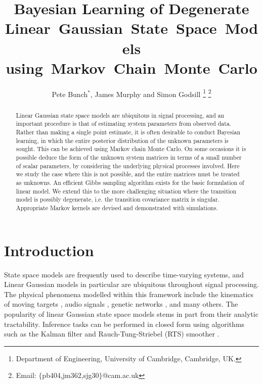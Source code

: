 \documentclass[journal,10pt]{IEEEtran}
\title{Bayesian Learning of Degenerate Linear~Gaussian~State~Space~Models using~Markov~Chain~Monte~Carlo}
\author{Pete Bunch$^*$, James Murphy and Simon Godsill
  \thanks{Department of Engineering, University of Cambridge, Cambridge, UK.}
  \thanks{Email: $\{$pb404,jm362,sjg30$\}$@cam.ac.uk}%
}
\begin{document}
\maketitle



\begin{abstract}
Linear Gaussian state space models are ubiquitous in signal processing, and an important procedure is that of estimating system parameters from observed data. Rather than making a single point estimate, it is often desirable to conduct Bayesian learning, in which the entire posterior distribution of the unknown parameters is sought. This can be achieved using Markov chain Monte Carlo. On some occasions it is possible deduce the form of the unknown system matrices in terms of a small number of scalar parameters, by considering the underlying physical processes involved. Here we study the case where this is not possible, and the entire matrices must be treated as unknowns. An efficient Gibbs sampling algorithm exists for the basic formulation of linear model. We extend this to the more challenging situation where the transition model is possibly degenerate, i.e. the transition covariance matrix is singular. Appropriate Markov kernels are devised and demonstrated with simulations.
\end{abstract}



\section{Introduction}

State space models are frequently used to describe time-varying systems, and Linear Gaussian models in particular are ubiquitous throughout signal processing. The physical phenomena modelled within this framework include the kinematics of moving targets \cite{Bar-Shalom2002}, audio signals \cite{Godsill1998}, genetic networks \cite{Beal2005}, and many others. The popularity of linear Gaussian state space models stems in part from their analytic tractability. Inference tasks can be performed in closed form using algorithms such as the Kalman filter \cite{Kalman1960} and Rauch-Tung-Striebel (RTS) smoother \cite{Rauch1965}.
\end{document}
